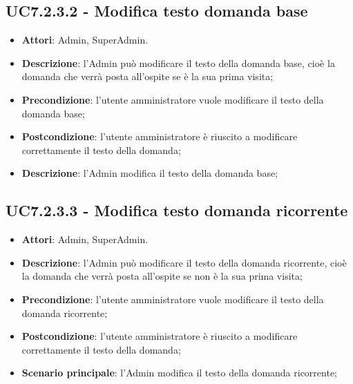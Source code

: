 \documentclass[../AnalisiDeiRequisiti_v3.0.0.tex]{subfiles}
\begin{document}
\subsection{UC7.2.3.2 - Modifica testo domanda base} 
\label{sssec:UC7.2.3.2} 
\begin{itemize} 
\item \textbf{Attori}: Admin, SuperAdmin.
\item \textbf{Descrizione}: l'Admin può modificare il testo della domanda base, cioè la domanda che verrà posta all'ospite se è la sua prima visita;
\item \textbf{Precondizione}: l'utente amministratore vuole modificare il testo della domanda base;
\item \textbf{Postcondizione}: l'utente amministratore è riuscito a modificare correttamente il testo della domanda;
\item \textbf{Descrizione}: l'Admin modifica il testo della domanda base;
\end{itemize} 
\subsection{UC7.2.3.3 - Modifica testo domanda ricorrente} 
\label{sssec:UC7.2.3.3} 
\begin{itemize} 
\item \textbf{Attori}: Admin, SuperAdmin.
\item \textbf{Descrizione}: l'Admin può modificare il testo della domanda ricorrente, cioè la domanda che verrà posta all'ospite se non è la sua prima visita;
\item \textbf{Precondizione}: l'utente amministratore vuole modificare il testo della domanda ricorrente;
\item \textbf{Postcondizione}: l'utente amministratore è riuscito a modificare correttamente il testo della domanda;
\item \textbf{Scenario principale}: l'Admin modifica il testo della domanda ricorrente;
\end{itemize}
\newpage
\end{document}
